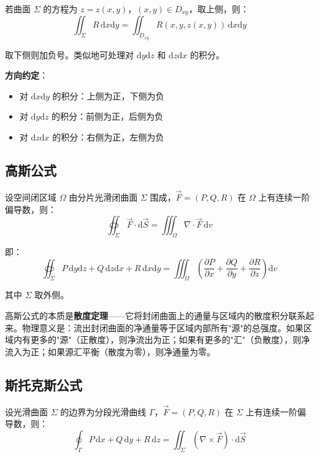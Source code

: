 若曲面 $\Sigma$ 的方程为 $z=z(x,y)$，$(x,y)\in D_{xy}$，取上侧，则：
\[
\iint_\Sigma R\,\mathrm{d}x\mathrm{d}y = \iint_{D_{xy}} R(x,y,z(x,y))\,\mathrm{d}x\mathrm{d}y
\]

取下侧则加负号。类似地可处理对 $\mathrm{d}y\mathrm{d}z$ 和 $\mathrm{d}z\mathrm{d}x$ 的积分。

\begin{warnbox}
\textbf{方向约定}：
\begin{itemize}[leftmargin=2em]
    \item 对 $\mathrm{d}x\mathrm{d}y$ 的积分：上侧为正，下侧为负
    \item 对 $\mathrm{d}y\mathrm{d}z$ 的积分：前侧为正，后侧为负
    \item 对 $\mathrm{d}z\mathrm{d}x$ 的积分：右侧为正，左侧为负
\end{itemize}
\end{warnbox}

\subsection{高斯公式}

设空间闭区域 $\Omega$ 由分片光滑闭曲面 $\Sigma$ 围成，$\vec{F} = (P, Q, R)$ 在 $\Omega$ 上有连续一阶偏导数，则：
\[
\oiint_\Sigma \vec{F}\cdot\mathrm{d}\vec{S} = \iiint_\Omega \nabla\cdot\vec{F}\,\mathrm{d}v
\]

即：
\[
\oiint_\Sigma P\,\mathrm{d}y\mathrm{d}z + Q\,\mathrm{d}z\mathrm{d}x + R\,\mathrm{d}x\mathrm{d}y = \iiint_\Omega \left(\frac{\partial P}{\partial x}+\frac{\partial Q}{\partial y}+\frac{\partial R}{\partial z}\right)\mathrm{d}v
\]

其中 $\Sigma$ 取外侧。

\begin{essencebox}
高斯公式的本质是\textbf{散度定理}——它将封闭曲面上的通量与区域内的散度积分联系起来。物理意义是：流出封闭曲面的净通量等于区域内部所有"源"的总强度。如果区域内有更多的"源"（正散度），则净流出为正；如果有更多的"汇"（负散度），则净流入为正；如果源汇平衡（散度为零），则净通量为零。
\end{essencebox}

\subsection{斯托克斯公式}

设光滑曲面 $\Sigma$ 的边界为分段光滑曲线 $\Gamma$，$\vec{F} = (P, Q, R)$ 在 $\Sigma$ 上有连续一阶偏导数，则：
\[
\oint_\Gamma P\,\mathrm{d}x + Q\,\mathrm{d}y + R\,\mathrm{d}z = \iint_\Sigma (\nabla\times\vec{F})\cdot\mathrm{d}\vec{S}
\]

